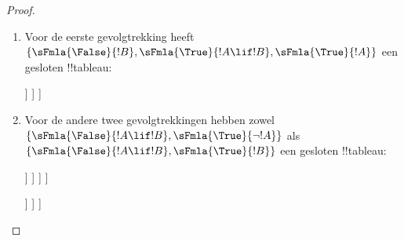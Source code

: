 \documentclass[../../../include/open-logic-section]{subfiles}
\begin{document}
\begin{proof}
  \begin{enumerate}
    \item Voor de eerste gevolgtrekking heeft
      $\{\sFmla{\False}{!B}, \sFmla{\True}{!A \lif !B},
      \sFmla{\True}{!A}\}$ een gesloten !!{tableau}:
      \begin{oltableau}
        [\sFmla{\False}{\formula{B}}, just=\TAss
          [\sFmla{\True}{\formula{A} \lif \formula{B}}, just=\TAss
            [\sFmla{\True}{\formula{A}}, just=\TAss
              [\sFmla{\False}{\formula{A}}, just = {\TRule{\True}{\lif}[2]}, close]
              [\sFmla{\True}{\formula{B}}, just = {\TRule{\True}{\lif}[2]}, close]
            ]
          ]
        ]
      \end{oltableau}
    \item Voor de andere twee gevolgtrekkingen hebben zowel
      $\{\sFmla{\False}{!A \lif !B},
      \sFmla{\True}{\lnot !A}\}$ als $\{\sFmla{\False}{!A \lif !B},
      \sFmla{\True}{!B}\}$ een gesloten !!{tableau}:
      \begin{oltableau}
        [\sFmla{\False}{\formula{A} \lif \formula{B}}, just = \TAss
          [\sFmla{\True}{\lnot \formula{A}}, just = \TAss
            [\sFmla{\True}{\formula{A}}, just = {\TRule{\False}{\lif}[1]}
              [\sFmla{\False}{\formula{B}}, just = {\TRule{\False}{\lif}[1]}
                [\sFmla{\False}{\formula{A}}, just = {\TRule{\True}{\lnot}[2]}, close]
              ]
            ]
          ]
        ]
      \end{oltableau}
      \begin{oltableau}
        [\sFmla{\False}{\formula{A} \lif \formula{B}}, just = \TAss
          [\sFmla{\True}{\formula{B}}, just = \TAss
            [\sFmla{\True}{\formula{A}}, just = {\TRule{\False}{\lif}[1]}
              [\sFmla{\False}{\formula{B}}, just = {\TRule{\False}{\lif}[1]},close
              ]
            ]
          ]
        ]
      \end{oltableau}
  \end{enumerate}
\end{proof}
\end{document}
